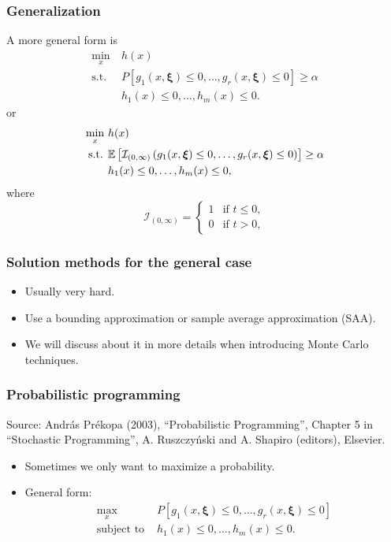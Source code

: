 \documentclass{beamer}
\def\bxi{\boldsymbol\xi}
\begin{document}
\begin{frame}
\frametitle{Generalization}

A more general form is
\begin{align*}
	\min_x \ & h(x) \\
	\text{s.t. } & P[ g_1(x, \bxi) \leq 0,\ldots, g_r(x, \bxi) \leq 0] \geq \alpha \\
	& h_1(x) \leq 0,\ldots, h_m(x) \leq 0.
\end{align*}
or
\begin{align*}
	\min_x \ & h(x) \\
	\text{s.t. } & \EE\left[ \mathcal{I}_{(0,\infty)} \left( g_1(x, \bxi) \leq 0,\ldots, g_r(x, \bxi) \leq 0 \right) \right] \geq \alpha \\
	& h_1(x) \leq 0,\ldots, h_m(x) \leq 0,
\end{align*}
where
$$
\mathcal{I}_{(0,\infty)} =
\begin{cases}
	1 & \mbox{if } t \leq 0,\\
	0 & \mbox{if } t > 0,
\end{cases}
$$

\end{frame}

\begin{frame}
\frametitle{Solution methods for the general case}

\begin{itemize}
\item	
Usually very hard.
\item
Use a bounding approximation or sample average approximation (SAA).
\item
We will discuss about it in more details when introducing Monte Carlo techniques.
\end{itemize}

\end{frame}

\begin{frame}
\frametitle{Probabilistic programming}

Source: András Prékopa (2003), ``Probabilistic Programming'', Chapter 5 in ``Stochastic Programming'', A. Ruszczy\'nski and A. Shapiro (editors), Elsevier.

\mbox{}

\begin{itemize}
	\item 
Sometimes we only want to maximize a probability.
\item
General form:
\begin{align*}
\max_x \ & P[ g_1(x, \bxi) \leq 0,\ldots, g_r(x, \bxi) \leq 0] \\
\text{subject to } & h_1(x) \leq 0,\ldots, h_m(x) \leq 0.
\end{align*}
\end{itemize}

\end{frame}
\end{document}

